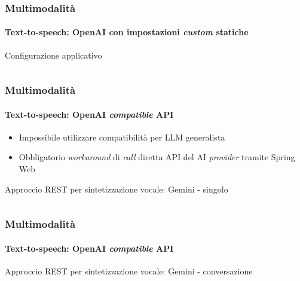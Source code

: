 %
\begin{frame}[t,fragile] \frametitle{Multimodalità}
    \framesubtitle{Text-to-speech: OpenAI con impostazioni \textit{custom} statiche} 
    {\footnotesize
        \begin{block}{Configurazione applicativo}
			{\tiny\inputminted{yaml}{code/application-tts.yml}}
    	\end{block}    
    }
\end{frame}    
%
\begin{frame}[t,fragile] \frametitle{Multimodalità}
\framesubtitle{Text-to-speech: OpenAI \textit{compatible} API}
    {\footnotesize
    \begin{itemize}[leftmargin=10pt,align=right]
        \item[\alert{\faExclamationTriangle}] Impossibile utilizzare compatibilità per LLM generalista
        \item[\alert{\faExclamationTriangle}] Obbligatorio \textit{workaround} di \textit{call} diretta API del AI \textit{provider} tramite Spring Web
    \end{itemize}
    \begin{block}{Approccio REST per sintetizzazione vocale: Gemini - singolo}
		{\tiny\inputminted{bash}{code/gemini-tts-single.sh}}
    \end{block}
    }
\end{frame} 
%
\begin{frame}[t,fragile] \frametitle{Multimodalità}
\framesubtitle{Text-to-speech: OpenAI \textit{compatible} API}
    \vspace*{-.7cm}
    {\footnotesize
    \begin{block}{Approccio REST per sintetizzazione vocale: Gemini - conversazione}
		{\tiny\inputminted{bash}{code/gemini-tts-conversation.sh}}
    \end{block}
    }
\end{frame}    
%
